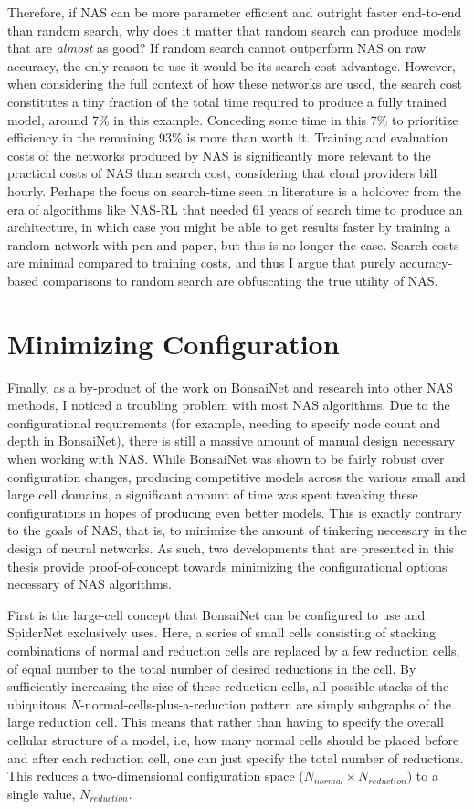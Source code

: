 Therefore, if NAS can be more parameter efficient and outright faster end-to-end than random search, why does it matter
that random search can produce models that are \textit{almost} as good? If random search cannot outperform NAS on raw accuracy,
the only reason to use it would be its search cost advantage. However, when considering the full context of how these
networks are used, the search cost constitutes a tiny fraction of the total time required to produce a fully trained model,
around 7\% in this example. Conceding some time in this 7\% to prioritize efficiency in the remaining
93\% is more than worth it. Training and evaluation costs of the networks produced by NAS is significantly more relevant
to the practical costs of NAS than search cost, considering
that cloud providers bill hourly. Perhaps the focus on search-time seen in literature is a holdover from the era of algorithms like NAS-RL that
needed 61 years of search time to produce an architecture, in which case you might be able to get results faster by
training a random network with pen and paper, but this is no longer the case. Search costs are minimal compared to training costs,
and thus I argue that purely accuracy-based comparisons to random search are obfuscating the true utility of NAS.

\vspace{-1em}
\section{Minimizing Configuration}
Finally, as a by-product of the work on BonsaiNet and research into other NAS methods, I noticed a troubling problem
with most NAS algorithms. Due to the configurational requirements (for example, needing to specify node count and
depth in BonsaiNet), there is still a massive amount of manual design necessary when working with NAS. While
BonsaiNet was shown to be fairly robust over configuration changes, producing competitive models across the various
small and large cell domains, a significant amount of time was spent tweaking these configurations in hopes of
producing even better models. This is exactly contrary to the goals of NAS, that is, to minimize the amount of tinkering
necessary in the design of neural networks. As such, two developments that are presented in this thesis provide proof-of-concept
towards minimizing the configurational options necessary of NAS algorithms.

First is the large-cell concept that BonsaiNet can be configured to use and SpiderNet exclusively uses. Here, a series
of small cells consisting of stacking combinations of normal and reduction cells are replaced by a few reduction cells,
of equal number to the total number of desired reductions in the cell. By sufficiently increasing the size of these reduction cells,
all possible stacks of the ubiquitous $N$-normal-cells-plus-a-reduction pattern are simply subgraphs of the large
reduction cell. This means that rather than having to specify the overall cellular structure of a model, i.e, how many
normal cells should be placed before and after each reduction cell, one can just specify the total number of reductions.
This reduces a two-dimensional configuration space ($N_{normal} \times N_{reduction}$) to a single value, $N_{reduction}$.


